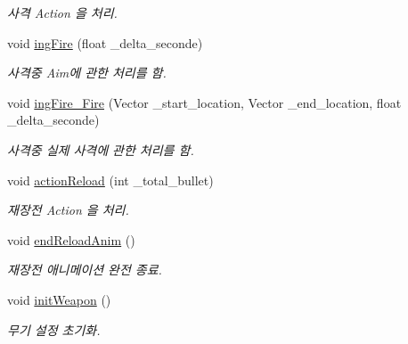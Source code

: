\begin{DoxyCompactItemize}
\begin{DoxyCompactList}\small\item\em 사격 Action 을 처리. \end{DoxyCompactList}\item 
void \hyperlink{class_person___character_ae24a8beecb67858f956a8d163a4d9333}{ing\+Fire} (float \+\_\+delta\+\_\+seconde)
\begin{DoxyCompactList}\small\item\em 사격중 Aim에 관한 처리를 함. \end{DoxyCompactList}\item 
void \hyperlink{class_person___character_a7d0f5b22056e049f5a46ca0b2abb91ae}{ing\+Fire\+\_\+\+Fire} (Vector \+\_\+start\+\_\+location, Vector \+\_\+end\+\_\+location, float \+\_\+delta\+\_\+seconde)
\begin{DoxyCompactList}\small\item\em 사격중 실제 사격에 관한 처리를 함. \end{DoxyCompactList}\item 
void \hyperlink{class_person___character_a593f0cb97f1f20e42c4ac6642f7dcefe}{action\+Reload} (int \+\_\+total\+\_\+bullet)
\begin{DoxyCompactList}\small\item\em 재장전 Action 을 처리. \end{DoxyCompactList}\item 
void \hyperlink{class_person___character_a5dbcfc49bf5c92294d551a5ead444a80}{end\+Reload\+Anim} ()
\begin{DoxyCompactList}\small\item\em 재장전 애니메이션 완전 종료. \end{DoxyCompactList}\item 
void \hyperlink{class_person___character_adbf33aaddc281c52cc62ab6c59be7b77}{init\+Weapon} ()
\begin{DoxyCompactList}\small\item\em 무기 설정 초기화. \end{DoxyCompactList}\end{DoxyCompactItemize}

